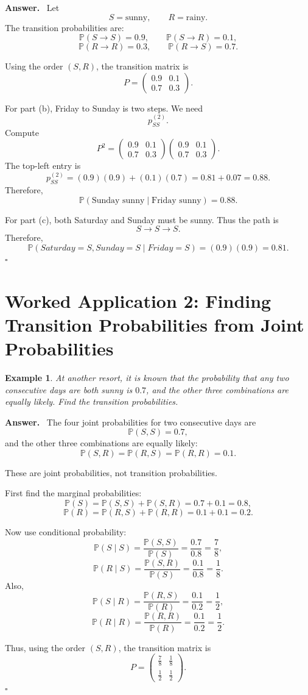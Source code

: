 \documentclass[12pt,a4paper]{article}
\theoremstyle{lecturestyle}
\newtheorem{example}{Example}
\newenvironment{answer}
{\par\textbf{Answer.}\ }
{\hfill$\square$\par}
\newcommand{\Prob}{\mathbb{P}}
\begin{document}
\begin{answer}
Let
\[
S=\text{sunny},\qquad R=\text{rainy}.
\]
The transition probabilities are:
\[
\Prob(S\to S)=0.9,
\qquad
\Prob(S\to R)=0.1,
\]
\[
\Prob(R\to R)=0.3,
\qquad
\Prob(R\to S)=0.7.
\]

Using the order $(S,R)$, the transition matrix is
\[
P=
\begin{pmatrix}
0.9 & 0.1\\
0.7 & 0.3
\end{pmatrix}.
\]

For part (b), Friday to Sunday is two steps. We need
\[
p_{SS}^{(2)}.
\]
Compute
\[
P^2=
\begin{pmatrix}
0.9 & 0.1\\
0.7 & 0.3
\end{pmatrix}
\begin{pmatrix}
0.9 & 0.1\\
0.7 & 0.3
\end{pmatrix}.
\]
The top-left entry is
\[
p_{SS}^{(2)}
=(0.9)(0.9)+(0.1)(0.7)
=0.81+0.07
=0.88.
\]
Therefore,
\[
\Prob(\text{Sunday sunny}\mid \text{Friday sunny})=0.88.
\]

For part (c), both Saturday and Sunday must be sunny. Thus the path is
\[
S\to S\to S.
\]
Therefore,
\[
\Prob(Saturday=S,Sunday=S\mid Friday=S)
=
(0.9)(0.9)
=0.81.
\]
\end{answer}

\section{Worked Application 2: Finding Transition Probabilities from Joint Probabilities}

\begin{example}
At another resort, it is known that the probability that any two consecutive days are both sunny is $0.7$, and the other three combinations are equally likely. Find the transition probabilities.
\end{example}

\begin{answer}
The four joint probabilities for two consecutive days are
\[
\Prob(S,S)=0.7,
\]
and the other three combinations are equally likely:
\[
\Prob(S,R)=\Prob(R,S)=\Prob(R,R)=0.1.
\]

These are joint probabilities, not transition probabilities.

First find the marginal probabilities:
\[
\Prob(S)=\Prob(S,S)+\Prob(S,R)=0.7+0.1=0.8,
\]
\[
\Prob(R)=\Prob(R,S)+\Prob(R,R)=0.1+0.1=0.2.
\]

Now use conditional probability:
\[
\Prob(S\mid S)=\frac{\Prob(S,S)}{\Prob(S)}
=\frac{0.7}{0.8}
=\frac78,
\]
\[
\Prob(R\mid S)=\frac{\Prob(S,R)}{\Prob(S)}
=\frac{0.1}{0.8}
=\frac18.
\]
Also,
\[
\Prob(S\mid R)=\frac{\Prob(R,S)}{\Prob(R)}
=\frac{0.1}{0.2}
=\frac12,
\]
\[
\Prob(R\mid R)=\frac{\Prob(R,R)}{\Prob(R)}
=\frac{0.1}{0.2}
=\frac12.
\]

Thus, using the order $(S,R)$, the transition matrix is
\[
\boxed{
P=
\begin{pmatrix}
\frac78 & \frac18\\
\frac12 & \frac12
\end{pmatrix}.
}
\]
\end{answer}
\end{document}
